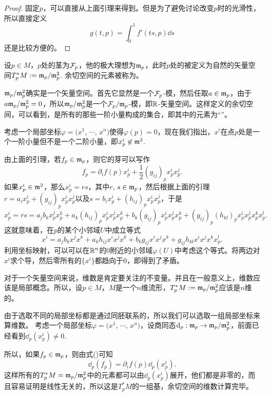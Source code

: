 \begin{proof}
	固定$p$，可以直接从上面引理来得到。但是为了避免讨论改变$p$时的光滑性，所以直接定义
	\[
	g(t,p)=\int_0^1 f'(ts,p)\dd s
	\]
	还是比较方便的。
\end{proof}

\begin{para}
设$p\in M$，$p$处的茎为$\mathcal{F}_p$，他的极大理想为$\mathfrak{m}_p$，此时$p$处的被定义为自然的矢量空间$T_p^*M:=\mathfrak{m}_p/\mathfrak{m}_p^2$. 余切空间的元素被称为。

$\mathfrak{m}_p/\mathfrak{m}_p^2$确实是一个矢量空间。首先它显然是一个$\mathcal{F}_p$-模，然后任取$a\in \mathfrak{m}_p$，由于$a\mathfrak{m}_p/\mathfrak{m}_p^2=0$，所以$\mathfrak{m}_p/\mathfrak{m}_p^2$是一个$\mathcal{F}_p/\mathfrak{m}_p$-模，即$\mathbb{R}$-矢量空间。这样定义的余切空间，可以看到，是所有的那些一阶小量构成的集合，即其中的元素为“”。
\end{para}

考虑一个局部坐标$\varphi=(x^1$, $\cdots$, $x^n)$使得$\varphi(p)=0$，现在我们指出，$x^i$在点$p$处是一个一阶小量但不是一个二阶小量，即$x^i_p\not\in \mathfrak{m}^2$.

由上面的引理，若$f_p\in \mathfrak{m}_p$，则它的芽可以写作
\begin{equation}
f_p=\partial_i f(p)x^i_p+\frac{1}{2}(g_{ij})_p x^i_px^j_p.
\end{equation}
如果$x^i_p\in \mathfrak{m}^2$，那么$x^i_p=rs$，其中$r$, $s\in \mathfrak{m}_p$，然后根据上面的引理$r=a_ix^i_p+(g_{ij})_p x^i_px^j_p$以及$s=b_ix^i_p+(h_{ij})_p x^i_px^j_p$，于是
\[
	x^i_p=rs=a_jb_kx^j_px^k_p+a_k(h_{ij})_p x^i_px^j_px^k_p+b_k(g_{ij})_p x^i_px^j_px^k_p+(g_{ij})_p(h_{kl})_px^i_px^j_px^k_px^l_p.
\]
这就意味着，在$p$的某个小邻域$U$中成立等式
\[
	x^i=a_jb_kx^jx^k+a_k h_{ij} x^ix^jx^k+b_k g_{ij} x^ix^jx^k+ g_{ij} h_{kl} x^ix^jx^kx^l_p.
\]
利用坐标映射，可以可以在$\mathbb{R}^n$的$0$附近的小邻域$\varphi(U)$中考虑这个等式。将两边对$x^i$求个导，然后零所有的$\{x^i\}$都趋向于$0$，即得到了矛盾。

\begin{para}
对于一个矢量空间来说，维数是肯定要关注的不变量。并且在一般意义上，维数应该是局部概念。所以，设$p\in M$，$M$是一个$n$维流形，$T_p^*M:=\mathfrak{m}_p/\mathfrak{m}_p^2$应该是$n$维的。

由于选取不同的局部坐标都是通过同胚联系的，所以我们可以选取一组局部坐标来算维数。
考虑一个局部坐标$\varphi=(x^1$, $\cdots$, $x^n)$，设商同态$\mathrm{d}_p:\mathfrak{m}_p\to \mathfrak{m}_p/\mathfrak{m}_p^2$，前面已经看到$\dd_p(x^i_p)\neq 0$. 

所以，如果$f_p\in \mathfrak{m}_p$，则由式(\theequation)可知
\begin{equation}
\label{c1:e1}
	\dd_p(f_p)=\partial_i f(p)\dd_p(x^i_p).
\end{equation}
这样所有的$T_p^*M=\mathfrak{m}_p/\mathfrak{m}_p^2$中的元素都可以由$\dd_p(x^i_p)$展开，他们都是非零的，而且容易证明是线性无关的，所以这是$T_p^*M$的一组基，余切空间的维数计算完毕。
\end{para}

